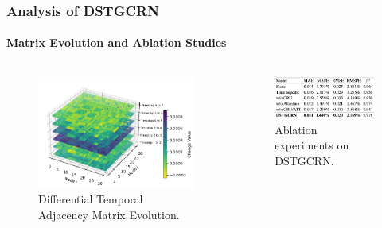 \documentclass[light]{lutbeamer} %
\begin{document}
\begin{frame}
    \frametitle{Analysis of DSTGCRN}
    \framesubtitle{Matrix Evolution and Ablation Studies}

    \begin{columns}[T] %

        \begin{column}{0.48\textwidth}
            \begin{figure}
                \centering
                \includegraphics[width=\textwidth]{figures/adj_heatmap_stack.png}
                \caption{Differential Temporal Adjacency Matrix Evolution.}
            \end{figure}
        \end{column}

        \begin{column}{0.48\textwidth}
            \begin{figure}
                \centering
                \includegraphics[width=\textwidth]{figures/dstgcrn_ablation.png}
                \caption{Ablation experiments on DSTGCRN.}
            \end{figure}
        \end{column}

    \end{columns}
\end{frame}
\end{document}
